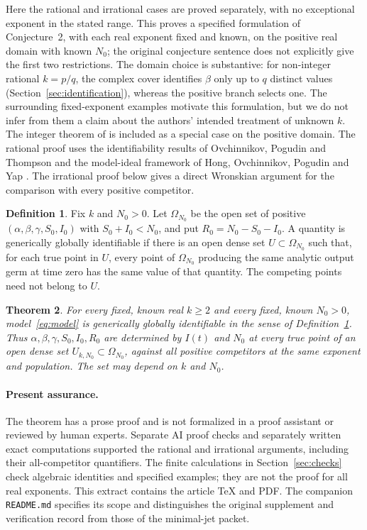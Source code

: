 \documentclass[10pt,a4paper]{article}
\newtheorem{theorem}{Theorem}
\theoremstyle{definition}\newtheorem{definition}[theorem]{Definition}
\begin{document}
Here the rational and irrational cases are proved separately, with
no exceptional exponent in the stated range. This proves a specified formulation of Conjecture~2,
with each real exponent fixed and known, on the
positive real domain with known $N_0$; the original conjecture sentence
does not explicitly give the first two restrictions. The domain choice
is substantive: for non-integer rational $k=p/q$, the complex cover
identifies $\beta$ only up to $q$ distinct values
(Section~\ref{sec:identification}), whereas the positive branch selects
one. The surrounding
fixed-exponent examples motivate this formulation, but we do not infer
from them a claim about the authors' intended treatment of unknown $k$.
The integer theorem of \cite{V1} is included as a special case on the
positive domain. The rational proof uses the identifiability results
of Ovchinnikov, Pogudin and Thompson \cite{OPT} and the model-ideal
framework of Hong, Ovchinnikov, Pogudin and Yap \cite{HOPY}.
The irrational proof below gives a direct Wronskian argument for the
comparison with every positive competitor.

\begin{samepage}
\begin{definition}
\label{def:id}
Fix $k$ and $N_0>0$. Let $\Omega_{N_0}$ be the open set of positive
$(\alpha,\beta,\gamma,S_0,I_0)$ with $S_0+I_0<N_0$, and put
$R_0=N_0-S_0-I_0$. A quantity is generically globally identifiable if
there is an open dense set $U\subset\Omega_{N_0}$ such that, for each
true point in $U$, every point of $\Omega_{N_0}$ producing the same
analytic output germ at time zero has the same value of that quantity.
The competing points need not belong to $U$.
\end{definition}
\end{samepage}

\begin{theorem}
\label{thm:main}
For every fixed, known real $k\geq2$ and every fixed, known $N_0>0$,
model~\eqref{eq:model} is generically globally identifiable in the
sense of Definition~\ref{def:id}. Thus $\alpha,\beta,\gamma,S_0,I_0,R_0$
are determined by $I(t)$ and $N_0$ at every true point of an open dense
set $U_{k,N_0}\subset\Omega_{N_0}$, against all positive competitors
at the same exponent and population. The set may depend on $k$ and $N_0$.
\end{theorem}

\paragraph{Present assurance.}
The theorem has a prose proof and is not formalized in a proof assistant
or reviewed by human experts. Separate AI proof checks and separately
written exact computations supported the rational and irrational
arguments, including their all-competitor quantifiers. The finite
calculations in Section~\ref{sec:checks} check algebraic identities and
specified examples; they are not the proof for all real exponents.
This extract contains the article TeX and PDF. The companion
\texttt{README.md} specifies its scope and distinguishes the original
supplement and verification record from those of the minimal-jet packet.
\end{document}
